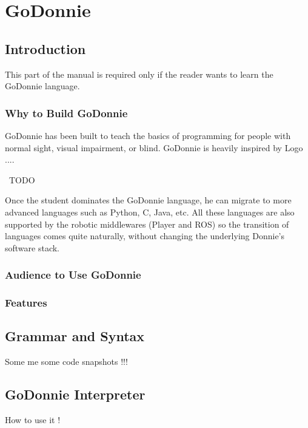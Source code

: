 \chapter{GoDonnie}

\section{Introduction}
\label{sec:godonnie_intro}

This part of the manual is required only if the reader wants to learn the GoDonnie language. 

\subsection{Why to Build GoDonnie}

GoDonnie has been built to teach the basics of programming for people with normal sight, visual impairment, or blind.
GoDonnie is heavily inspired by Logo ....

{\ TODO}

Once the student dominates the GoDonnie language, he can migrate to more advanced languages such as Python, C, Java, etc. 
All these languages are also supported by the robotic middlewares (Player and ROS) so the transition of languages comes quite naturally, without changing the underlying Donnie's software stack. 

\subsection{Audience to Use GoDonnie}

\subsection{Features}




\section{Grammar and Syntax}
\label{sec:godonnie_grammar}

Some me some code snapshots !!!

\section{GoDonnie Interpreter}
\label{sec:godonnie_interp}

How to use it !

